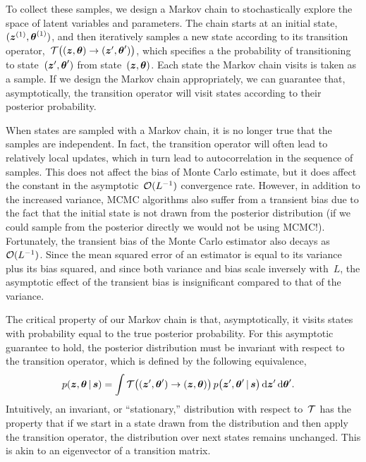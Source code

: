 To collect these samples, we design a Markov chain to stochastically
explore the space of latent variables and parameters.  
The chain starts at an initial state,~${(\boldsymbol{z}^{(1)}, \boldsymbol{\theta}^{(1)})}$,
and then iteratively samples a new state according to its transition
operator,~${\mathcal{T} \big((\boldsymbol{z}, \boldsymbol{\theta}) \to (\boldsymbol{z}', \boldsymbol{\theta}') \big)}$, which
specifies a the probability of transitioning to
state~${(\boldsymbol{z}', \boldsymbol{\theta}')}$ from state~${(\boldsymbol{z}, \boldsymbol{\theta})}$.  Each state
the Markov chain visits is taken as a sample. If we design the Markov
chain appropriately, we can guarantee that, asymptotically, the
transition operator will visit states according to their posterior
probability. 

When states are sampled with a Markov chain, it is no longer true that
the samples are independent. In fact, the transition operator will
often lead to relatively local updates, which in turn lead to autocorrelation
in the sequence of samples. This does not affect the bias of Monte
Carlo estimate, but it does affect the constant in the
asymptotic~$\mathcal{O}(L^{-1})$ convergence rate. However, in addition to 
the increased variance, MCMC algorithms also suffer from a transient 
bias due to the fact that the initial state is not drawn from the 
posterior distribution (if we could sample from the posterior directly we would 
not be using MCMC!). Fortunately, the transient bias 
of the Monte Carlo estimator also decays as~$\mathcal{O}(L^{-1})$. Since the 
mean squared error of an estimator is equal to its variance plus its 
 bias squared, and since both variance and bias scale inversely with~$L$, 
the asymptotic effect of the transient bias is insignificant compared to 
that of the variance. 

The critical property of our Markov chain is that, asymptotically, it
visits states with probability equal to the true posterior
probability.  For this asymptotic guarantee to hold, the posterior
distribution must be invariant with respect to the transition
operator, which is defined by the following equivalence,
\begin{align}
  \label{eq:invariance}
  p(\boldsymbol{z}, \boldsymbol{\theta} \,|\, \boldsymbol{s}) 
  &= \int \mathcal{T} \big((\boldsymbol{z}', \boldsymbol{\theta}') \to (\boldsymbol{z}, \boldsymbol{\theta}) \big) \, 
    p \big(\boldsymbol{z}', \boldsymbol{\theta}' \,|\, \boldsymbol{s} \big) \, 
    \mathrm{d}\boldsymbol{z}' \, \mathrm{d}\boldsymbol{\theta}'. 
\end{align}
Intuitively, an invariant, or ``stationary,'' distribution with respect 
to~$\mathcal{T}$ has the property that if we start in a state drawn from the 
distribution and then apply the transition operator, the distribution 
over next states remains unchanged. This is akin to an eigenvector of 
a transition matrix. 

